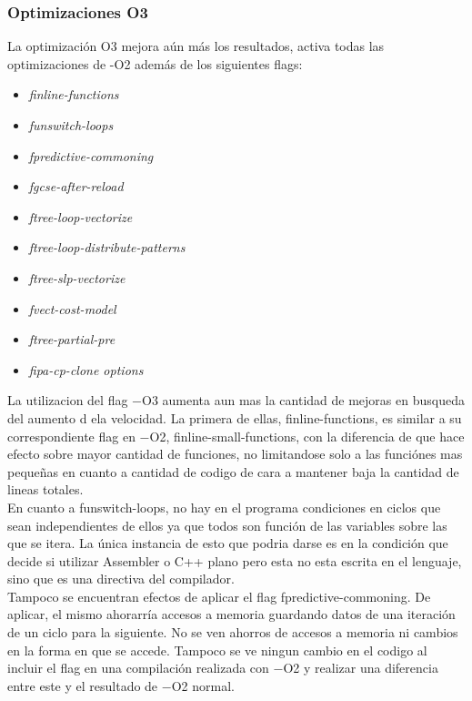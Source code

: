 \subsubsection{Optimizaciones O3}

La optimización O3 mejora aún más los resultados, activa todas las optimizaciones de -O2 además de los siguientes flags:

\begin{itemize}
\item \textit{finline-functions}
\item \textit{funswitch-loops}
\item \textit{fpredictive-commoning}
\item \textit{fgcse-after-reload}
\item \textit{ftree-loop-vectorize}
\item \textit{ftree-loop-distribute-patterns}
\item \textit{ftree-slp-vectorize}
\item \textit{fvect-cost-model}
\item \textit{ftree-partial-pre}
\item \textit{fipa-cp-clone options}
\end{itemize}

La utilizacion del flag $-$O3 aumenta aun mas la cantidad de mejoras en busqueda del aumento d ela velocidad. La primera de ellas, finline-functions, es similar a su correspondiente flag en $-$O2, finline-small-functions, con la diferencia de que hace efecto sobre mayor cantidad de funciones, no limitandose solo a las funciónes mas pequeñas en cuanto a cantidad de codigo de cara a mantener baja la cantidad de lineas totales.
\\
En cuanto a funswitch-loops, no hay en el programa condiciones en ciclos que sean independientes de ellos ya que todos son función de las variables sobre las que se itera. La única instancia de esto que podria darse es en la condición que decide si utilizar Assembler o C++ plano pero esta no esta escrita en el lenguaje, sino que es una directiva del compilador.
\\
Tampoco se encuentran efectos de aplicar el flag fpredictive-commoning. De aplicar, el mismo ahorarría accesos a memoria guardando datos de una iteración de un ciclo para la siguiente. No se ven ahorros de accesos a memoria ni cambios en la forma en que se accede. Tampoco se ve ningun cambio en el codigo al incluir el flag en una compilación realizada con $-$O2 y realizar una diferencia entre este y el resultado de $-$O2 normal.




